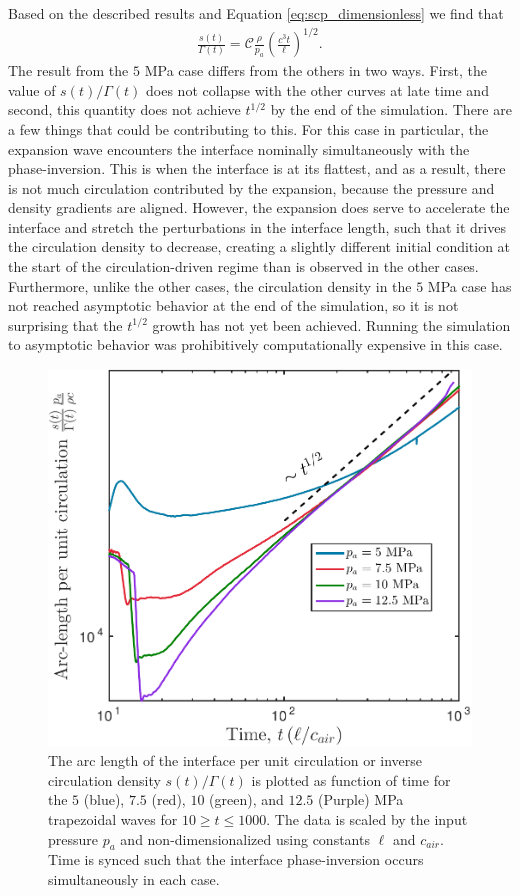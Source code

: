 Based on the described results and Equation \eqref{eq:scp_dimensionless} we find that 
\begin{align}
  \label{eq:scp_relationship}
  \frac{s(t)}{\Gamma(t)} = \mathcal{C}\frac{\rho}{p_a}\left(\frac{c^3t}{\ell}\right)^{1/2}.
\end{align}
The result from the $5$ MPa case differs from the others in
two ways. First, the value of $s(t)/\Gamma(t)$ does not collapse with
the other curves at late time and second, this quantity does not
achieve $t^{1/2}$ by the end of the simulation. There are a few things
that could be contributing to this. For this case in particular, the
expansion wave encounters the interface nominally simultaneously with
the phase-inversion. This is when the interface is at its flattest,
and as a result, there is not much circulation contributed by the
expansion, because the pressure and density gradients are
aligned. However, the expansion does serve to accelerate the interface
and stretch the perturbations in the interface length, such that it
drives the circulation density to decrease, creating a slightly
different initial condition at the start of the circulation-driven
regime than is observed in the other cases. Furthermore, unlike the
other cases, the circulation density in the $5$ MPa case has not
reached asymptotic behavior at the end of the simulation, so it is not
surprising that the $t^{1/2}$ growth has not yet been
achieved. Running the simulation to asymptotic behavior was
prohibitively computationally expensive in this case.

\begin{figure}
  \centering
  \includegraphics[height=0.45\textwidth]{./figs/lung_figs/scp_t1000_23-Dec-2016}
  \caption[The interface arc length at long times]{The arc length of
    the interface per unit circulation or inverse circulation density
    $s(t)/\Gamma(t)$ is plotted as function of time for the $5$
    (blue), $7.5$ (red), $10$ (green), and $12.5$ (Purple) MPa
    trapezoidal waves for $10\geq t\leq 1000$. The data is scaled by
    the input pressure $p_a$ and non-dimensionalized using constants
    $\ell$ and $c_{air}$. Time is synced such that the interface
    phase-inversion occurs simultaneously in each case.}
  \label{fig:trapz_scp_t1000}
\end{figure}
% 
